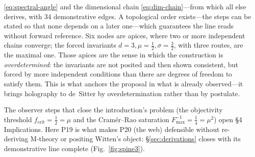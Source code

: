 \eqref{eq:spectral-angle} and the dimensional chain \eqref{eq:dim-chain}---from which all else
derives, with $34$ demonstrative edges. A topological order exists---the steps can be stated so
that none depends on a later one---which guarantees the line reads without forward reference. Six
nodes are apices, where two or more independent chains converge; the forced invariants
$d{=}3,\mu{=}\tfrac12,\sigma{=}\tfrac32$, with three routes, are the maximal one.
Those apices are the sense in which the construction is \emph{overdetermined}: the invariants
are not posited and then shown consistent, but forced by more independent conditions than
there are degrees of freedom to satisfy them. This is what anchors the proposal in what is
already observed---it brings holography to de~Sitter by overdetermination rather than by
postulate.

\noindent The observer steps that close the introduction's problem (the objectivity threshold
$f_{\mathrm{crit}}=\tfrac12=\mu$ and the Cram\'er--Rao saturation $F_{\max}^{-1}=\tfrac14=\mu^{2}$) open
\S4 Implications. Here P19 is what makes P20 (the web) defensible without re-deriving M-theory or
positing Witten's object: \S\ref{sec:derivations} closes with its demonstrative line complete (Fig.~\ref{fig:spine3}).

\FloatBarrier
